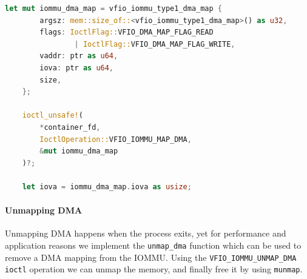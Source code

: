\begin{lstlisting}[language=Rust,caption={Mapping memory for DMA}, label=lst:mapdma]
    let mut iommu_dma_map = vfio_iommu_type1_dma_map {
        argsz: mem::size_of::<vfio_iommu_type1_dma_map>() as u32,
        flags: IoctlFlag::VFIO_DMA_MAP_FLAG_READ 
                | IoctlFlag::VFIO_DMA_MAP_FLAG_WRITE,
        vaddr: ptr as u64,
        iova: ptr as u64,
        size,
    };

    ioctl_unsafe!(
        *container_fd,
        IoctlOperation::VFIO_IOMMU_MAP_DMA,
        &mut iommu_dma_map
    )?;

    let iova = iommu_dma_map.iova as usize; 
\end{lstlisting}

\paragraph{Unmapping DMA}
Unmapping DMA happens when the process exits, yet for performance and application reasons we implement the \texttt{unmap\_dma} function which can be used to remove a DMA mapping from the IOMMU. Using the \texttt{VFIO\_IOMMU\_UNMAP\_DMA} \texttt{ioctl} operation we can unmap the memory, and finally free it by using \texttt{munmap}.

\newpage

